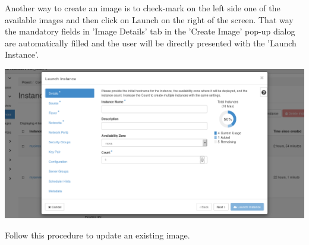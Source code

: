 Another way to create an image is to check-mark on the left side one of the available images and then click on Launch on the right of the screen. That way the mandatory fields in 'Image Details' tab in the 'Create Image' pop-up dialog are automatically filled and the user will be directly presented with the 'Launch Instance'.

\begin{center}
\includegraphics[scale=0.5]{img/tab-compute-instances-launch.png}
\end{center}



Follow this procedure to update an existing image.

